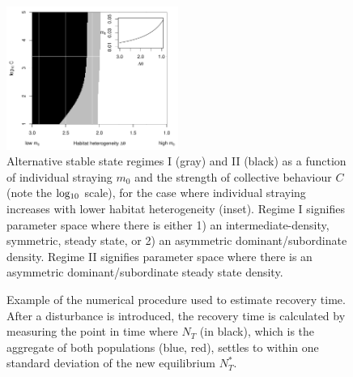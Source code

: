 \documentclass{revtex4}
\newcommand{\beginsupplement}{%
        \clearpage
        \setcounter{table}{0}
        \renewcommand{\thetable}{S\arabic{table}}%
        \setcounter{figure}{0}
        \renewcommand{\thefigure}{S\arabic{figure}}%
     }
\begin{document}
\begin{figure}
  \captionsetup{justification=raggedright,
singlelinecheck=false
}
\centering
\includegraphics[width=0.5\textwidth]{fig_hysteresis_ddm_mtheta.pdf}
\caption{
Alternative stable state regimes I (gray) and II (black) as a function of individual straying $m_0$ and the strength of collective behaviour $C$ (note the $\rm log_{10}$ scale), for the case where individual straying increases with lower habitat heterogeneity (inset).
Regime I signifies parameter space where there is either 1) an intermediate-density, symmetric, steady state, or 2) an asymmetric dominant/subordinate density.
Regime II signifies parameter space where there is an asymmetric dominant/subordinate steady state density.
} \label{fig:mtheta}
\end{figure}




\beginsupplement



\begin{figure}
  \captionsetup{justification=raggedright,
singlelinecheck=false
}
\centering
\caption{
Example of the numerical procedure used to estimate recovery time. After a disturbance is introduced, the recovery time is calculated by measuring the point in time where $N_T$ (in black), which is the aggregate of both populations (blue, red), settles to within one standard deviation of the new equilibrium $N_T^*$. 
} \label{fig:recovery}
\end{figure}
\end{document}
